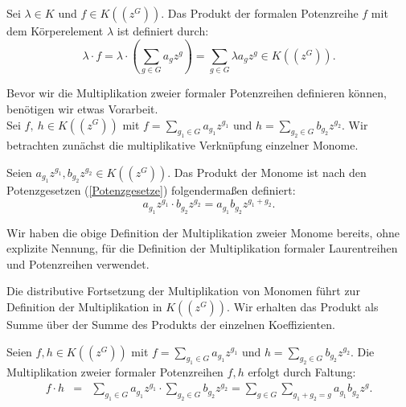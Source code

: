 %
%
%
\begin{defn}\label{MultiplikationMitKörperelement}
Sei $\lambda \in K$ und $f \in K\left(\left(z^{G}\right)\right)$. Das Produkt der formalen Potenzreihe $f$ mit dem Körperelement $\lambda$ ist definiert durch: 
\[\lambda\cdot f = \lambda \cdot \left(\sum_{g \in G}^{} a_g z^g\right) = \sum_{g \in G}^{} \lambda a_g z^g \in K\left(\left(z^{G}\right)\right).\]
\end{defn}
  
Bevor wir die Multiplikation zweier formaler Potenzreihen definieren können, benötigen wir etwas Vorarbeit.\\
Sei $f,~ h \in K\left(\left(z^{G}\right)\right)$ mit $ f = \sum_{g_1 \in G}^{} a_{g_1} z^{g_1} \text{ und } h = \sum_{g_2 \in G}^{} b_{g_2} z^{g_2} $. 
%
%
%
%
%
%
Wir betrachten zunächst die multiplikative Verknüpfung einzelner Monome. 
\begin{defn}
Seien $a_{g_1} z^{g_1}, b_{g_2} z^{g_2} \in K\left(\left(z^G\right)\right)$. Das Produkt der Monome ist nach den Potenzgesetzen (\ref{Potenzgesetze}) folgendermaßen definiert: 
\[a_{g_1} z^{g_1} \cdot b_{g_2}z^{g_2} = a_{g_1} b_{g_2} z^{g_1 + g_2}.\]
\end{defn}
%
%
\begin{bem}
Wir haben die obige Definition der Multiplikation zweier Monome bereits, ohne explizite Nennung, für die Definition der Multiplikation formaler Laurentreihen und Potenzreihen verwendet. 
\end{bem}
%
%
%
%
%
%
%
Die distributive Fortsetzung der Multiplikation von Monomen führt zur Definition der Multiplikation in $K\left(\left(z^{G}\right)\right)$. Wir erhalten das Produkt als Summe über der Summe des Produkts der einzelnen Koeffizienten.
%
%
%
\begin{defn}\label{MultiplikationformalePotenzreihen}
Seien $f, h \in K\left(\left(z^G\right)\right)$ mit $f = \sum_{g_1 \in G}^{} a_{g_1} z^{g_1} \text{ und } h = \sum_{g_2 \in G}^{} b_{g_2} z^{g_2}$. Die Multiplikation zweier formaler Potenzreihen $f, h$ erfolgt durch Faltung: 
\begin{eqnarray}\label{eq: multPotenzreihenkoerper}  
 f\cdot h &=& \sum_{g_1 \in G}^{} a_{g_1} z^{g_1} \cdot \sum_{g_2 \in G}^{} b_{g_2} z^{g_2} 
= \sum_{g \in G}^{}\sum_{g_1 + g_2 = g}^{}a_{g_1} b_{g_2}z^g.  
\end{eqnarray} 
\end{defn}
